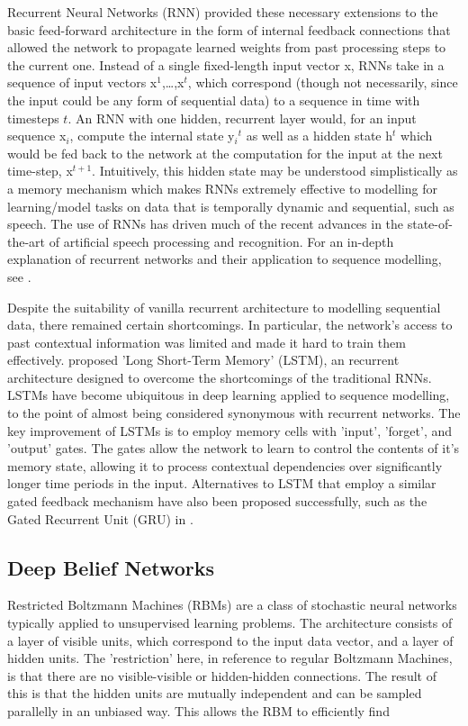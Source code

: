 \documentclass{article}[12pt]
\begin{document}
Recurrent Neural Networks (RNN) \cite{rumelhart1986} provided these necessary extensions to the basic feed-forward architecture in the form of internal feedback connections that allowed the network to propagate learned weights from past processing steps to the current one. Instead of a single fixed-length input vector x, RNNs take in a sequence of input vectors x$^1$,\ldots,x$^t$, which correspond (though not necessarily, since the input could be any form of sequential data) to a sequence in time with timesteps $t$. An RNN with one hidden, recurrent layer would, for an input sequence x$_i$, compute the internal state y$_i$$^t$ as well as a hidden state h$^t$ which would be fed back to the network at the computation for the input at the next time-step, x$^{t+1}$. Intuitively, this hidden state may be understood simplistically as a memory mechanism which makes RNNs extremely effective to modelling for learning/model tasks on data that is temporally dynamic and sequential, such as speech. The use of RNNs has driven much of the recent advances in the state-of-the-art of artificial speech processing and recognition. For an in-depth explanation of recurrent networks and their application to sequence modelling, see \cite{graves2012}.

Despite the suitability of vanilla recurrent architecture to modelling sequential data, there remained certain shortcomings. In particular, the network's access to past contextual information was limited and made it hard to train them effectively. \cite{hochreiter1997} proposed 'Long Short-Term Memory' (LSTM), an recurrent architecture designed to overcome the shortcomings of the traditional RNNs. LSTMs have become ubiquitous in deep learning applied to sequence modelling, to the point of almost being considered synonymous with recurrent networks. The key improvement of LSTMs is to employ memory cells with 'input', 'forget', and 'output' gates. The gates allow the network to learn to control the contents of it's memory state, allowing it to process contextual dependencies over significantly longer time periods in the input. Alternatives to LSTM that employ a similar gated feedback mechanism have also been proposed successfully, such as the Gated Recurrent Unit (GRU) in \cite{DBLP:journals/corr/ChoMBB14}.

\subsection{Deep Belief Networks}
Restricted Boltzmann Machines (RBMs) are a class of stochastic neural networks typically applied to unsupervised learning problems. The architecture consists of a layer of visible units, which correspond to the input data vector, and a layer of hidden units. The 'restriction' here, in reference to regular Boltzmann Machines, is that there are no visible-visible or hidden-hidden connections. The result of this is that the hidden units are mutually independent and can be sampled parallelly in an unbiased way. This allows the RBM to efficiently find
\end{document}
